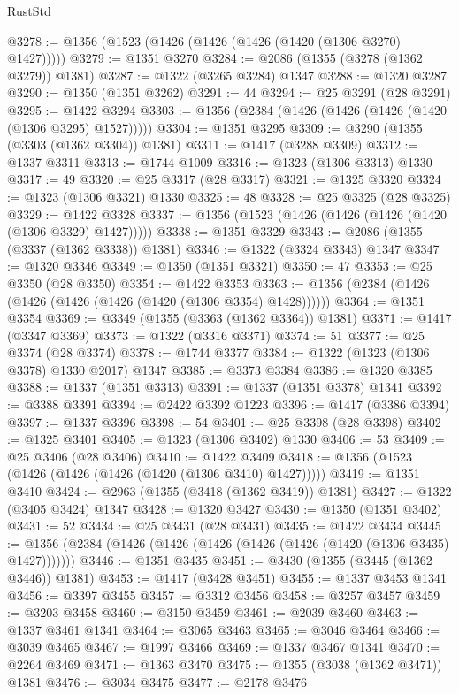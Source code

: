 \begin{lexlean}{RustStd}
\begin{coremodule}
@3278 := @1356 (@1523 (@1426 (@1426 (@1426 (@1420 (@1306 @3270) @1427)))))
@3279 := @1351 @3270
@3284 := @2086 (@1355 (@3278 (@1362 @3279)) @1381)
@3287 := @1322 (@3265 @3284) @1347
@3288 := @1320 @3287
@3290 := @1350 (@1351 @3262)
@3291 := 44
@3294 := @25 @3291 (@28 @3291)
@3295 := @1422 @3294
@3303 := @1356 (@2384 (@1426 (@1426 (@1426 (@1420 (@1306 @3295) @1527)))))
@3304 := @1351 @3295
@3309 := @3290 (@1355 (@3303 (@1362 @3304)) @1381)
@3311 := @1417 (@3288 @3309)
@3312 := @1337 @3311
@3313 := @1744 @1009
@3316 := @1323 (@1306 @3313) @1330
@3317 := 49
@3320 := @25 @3317 (@28 @3317)
@3321 := @1325 @3320
@3324 := @1323 (@1306 @3321) @1330
@3325 := 48
@3328 := @25 @3325 (@28 @3325)
@3329 := @1422 @3328
@3337 := @1356 (@1523 (@1426 (@1426 (@1426 (@1420 (@1306 @3329) @1427)))))
@3338 := @1351 @3329
@3343 := @2086 (@1355 (@3337 (@1362 @3338)) @1381)
@3346 := @1322 (@3324 @3343) @1347
@3347 := @1320 @3346
@3349 := @1350 (@1351 @3321)
@3350 := 47
@3353 := @25 @3350 (@28 @3350)
@3354 := @1422 @3353
@3363 := @1356 (@2384 (@1426 (@1426 (@1426 (@1426 (@1420 (@1306 @3354) @1428))))))
@3364 := @1351 @3354
@3369 := @3349 (@1355 (@3363 (@1362 @3364)) @1381)
@3371 := @1417 (@3347 @3369)
@3373 := @1322 (@3316 @3371)
@3374 := 51
@3377 := @25 @3374 (@28 @3374)
@3378 := @1744 @3377
@3384 := @1322 (@1323 (@1306 @3378) @1330 @2017) @1347
@3385 := @3373 @3384
@3386 := @1320 @3385
@3388 := @1337 (@1351 @3313)
@3391 := @1337 (@1351 @3378) @1341
@3392 := @3388 @3391
@3394 := @2422 @3392 @1223
@3396 := @1417 (@3386 @3394)
@3397 := @1337 @3396
@3398 := 54
@3401 := @25 @3398 (@28 @3398)
@3402 := @1325 @3401
@3405 := @1323 (@1306 @3402) @1330
@3406 := 53
@3409 := @25 @3406 (@28 @3406)
@3410 := @1422 @3409
@3418 := @1356 (@1523 (@1426 (@1426 (@1426 (@1420 (@1306 @3410) @1427)))))
@3419 := @1351 @3410
@3424 := @2963 (@1355 (@3418 (@1362 @3419)) @1381)
@3427 := @1322 (@3405 @3424) @1347
@3428 := @1320 @3427
@3430 := @1350 (@1351 @3402)
@3431 := 52
@3434 := @25 @3431 (@28 @3431)
@3435 := @1422 @3434
@3445 := @1356 (@2384 (@1426 (@1426 (@1426 (@1426 (@1426 (@1420 (@1306 @3435) @1427)))))))
@3446 := @1351 @3435
@3451 := @3430 (@1355 (@3445 (@1362 @3446)) @1381)
@3453 := @1417 (@3428 @3451)
@3455 := @1337 @3453 @1341
@3456 := @3397 @3455
@3457 := @3312 @3456
@3458 := @3257 @3457
@3459 := @3203 @3458
@3460 := @3150 @3459
@3461 := @2039 @3460
@3463 := @1337 @3461 @1341
@3464 := @3065 @3463
@3465 := @3046 @3464
@3466 := @3039 @3465
@3467 := @1997 @3466
@3469 := @1337 @3467 @1341
@3470 := @2264 @3469
@3471 := @1363 @3470
@3475 := @1355 (@3038 (@1362 @3471)) @1381
@3476 := @3034 @3475
@3477 := @2178 @3476

\end{coremodule}
\end{lexlean}
